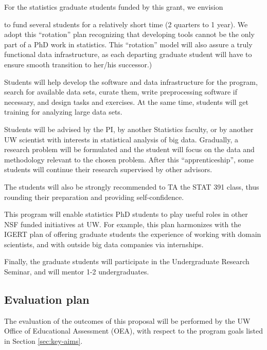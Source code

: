 For the statistics graduate students funded by this grant, we envision 
\bits
\item to fund several students for a relatively short time (2 quarters
  to 1 year). We adopt this ``rotation'' plan recognizing that developing 
tools cannot be the only part of a PhD work in statistics. 
This ``rotation'' model will also assure a truly functional data
infrastructure, as each departing graduate student 
will have to ensure smooth transition to her/his successor.)
\item Students will help develop the software and data infrastructure for
  the program, search for available data sets, curate them, write
  preprocessing software if necessary, and design tasks and exercises. 
  At the same time, students will get training for analyzing large data sets. 
\item Students will be advised by the PI, by another Statistics faculty, or by another UW scientist with interests in statistical analysis of big data. Gradually, a research problem will be formulated and the student will
focus on the data and methodology relevant to the chosen problem. After this ``apprenticeship'', 
some students will continue their research supervised by other advisors. 
\item The students will also be strongly recommended to TA the STAT 391 class, thus rounding their preparation and providing self-confidence. 
\item This program will enable statistics PhD students to play useful roles in other NSF funded initiatives at UW. For 
example, this plan harmonizes with the IGERT plan of offering graduate students the experience of working with domain scientists, and with outside big data companies via internships. 
\item Finally, the graduate students will participate in the Undergraduate Research Seminar, and will mentor 1-2 undergraduates. 
 \eits

\subsection{Evaluation plan}

The evaluation of the outcomes of this proposal will be performed by
the UW Office of Educational Assessment (OEA), with respect to the
program goals listed in Section \ref{sec:key-aims}.

